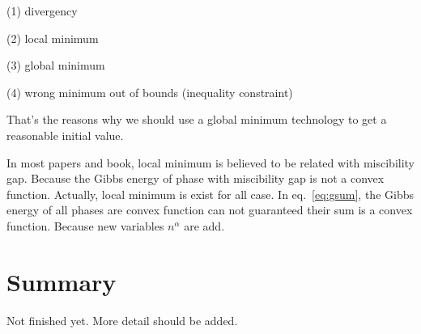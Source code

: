 \documentclass[12pt]{article}
\begin{document}
(1) divergency

(2) local minimum

(3) global minimum

(4) wrong minimum out of bounds (inequality constraint)

That's the reasons why we should use a global minimum technology 
to get a reasonable initial value.

In most papers and book, local minimum is believed to be related with miscibility gap. 
Because the Gibbs energy of phase with miscibility gap is not a convex function. Actually, 
local minimum is exist for all case. In eq.~\ref{eq:gsum}, the Gibbs energy of all
phases are convex function can not guaranteed their sum is a convex function. 
Because new variables $n^{\alpha}$ are add.


\section{Summary}

Not finished yet. More detail should be added.
\end{document}
